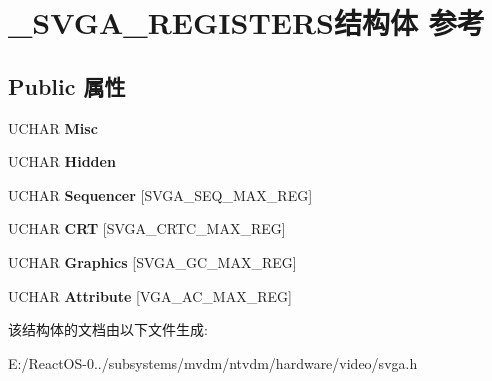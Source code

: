 \hypertarget{struct___s_v_g_a___r_e_g_i_s_t_e_r_s}{}\section{\+\_\+\+S\+V\+G\+A\+\_\+\+R\+E\+G\+I\+S\+T\+E\+R\+S结构体 参考}
\label{struct___s_v_g_a___r_e_g_i_s_t_e_r_s}
\subsection*{Public 属性}
\begin{DoxyCompactItemize}
\item 
\mbox{\label{struct___s_v_g_a___r_e_g_i_s_t_e_r_s_a9f997984806b30245eee9c4b5f1e6ba3}} 
U\+C\+H\+AR {\bfseries Misc}
\item 
\mbox{\label{struct___s_v_g_a___r_e_g_i_s_t_e_r_s_a4bc1ff1e450d5be1527dd0269c91559e}} 
U\+C\+H\+AR {\bfseries Hidden}
\item 
\mbox{\label{struct___s_v_g_a___r_e_g_i_s_t_e_r_s_a4378ed4020af64d985b93244a4eb92a0}} 
U\+C\+H\+AR {\bfseries Sequencer} \mbox{[}S\+V\+G\+A\+\_\+\+S\+E\+Q\+\_\+\+M\+A\+X\+\_\+\+R\+EG\mbox{]}
\item 
\mbox{\label{struct___s_v_g_a___r_e_g_i_s_t_e_r_s_a630bafcab2d190f7055b2d36b08cc948}} 
U\+C\+H\+AR {\bfseries C\+RT} \mbox{[}S\+V\+G\+A\+\_\+\+C\+R\+T\+C\+\_\+\+M\+A\+X\+\_\+\+R\+EG\mbox{]}
\item 
\mbox{\label{struct___s_v_g_a___r_e_g_i_s_t_e_r_s_a90a68730531eaf14770afffc6c7fd93a}} 
U\+C\+H\+AR {\bfseries Graphics} \mbox{[}S\+V\+G\+A\+\_\+\+G\+C\+\_\+\+M\+A\+X\+\_\+\+R\+EG\mbox{]}
\item 
\mbox{\label{struct___s_v_g_a___r_e_g_i_s_t_e_r_s_ad4fa58921b729ca8a8f9954570ee18de}} 
U\+C\+H\+AR {\bfseries Attribute} \mbox{[}V\+G\+A\+\_\+\+A\+C\+\_\+\+M\+A\+X\+\_\+\+R\+EG\mbox{]}
\end{DoxyCompactItemize}


该结构体的文档由以下文件生成\+:\begin{DoxyCompactItemize}
\item 
E\+:/\+React\+O\+S-\/0../subsystems/mvdm/ntvdm/hardware/video/svga.\+h\end{DoxyCompactItemize}

